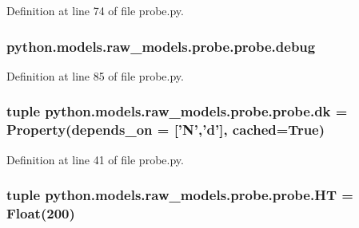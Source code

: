 Definition at line 74 of file probe.\-py.

\hypertarget{classpython_1_1models_1_1raw__models_1_1probe_1_1probe_a1efd16064847655675c89c36ec0da1d3}{
\subsubsection[{debug}]{\setlength{\rightskip}{0pt plus 5cm}python.\-models.\-raw\-\_\-models.\-probe.\-probe.\-debug}}\label{classpython_1_1models_1_1raw__models_1_1probe_1_1probe_a1efd16064847655675c89c36ec0da1d3}


Definition at line 85 of file probe.\-py.

\hypertarget{classpython_1_1models_1_1raw__models_1_1probe_1_1probe_a58c9fb8a7bbec972b51f5839d815f793}{
\subsubsection[{dk}]{\setlength{\rightskip}{0pt plus 5cm}tuple python.\-models.\-raw\-\_\-models.\-probe.\-probe.\-dk = Property(depends\-\_\-on = \mbox{[}'{\bf N}','{\bf d}'\mbox{]}, cached=True)\hspace{0.3cm}{\ttfamily [static]}}}\label{classpython_1_1models_1_1raw__models_1_1probe_1_1probe_a58c9fb8a7bbec972b51f5839d815f793}


Definition at line 41 of file probe.\-py.

\hypertarget{classpython_1_1models_1_1raw__models_1_1probe_1_1probe_a60c26931675d548d6d7886178df71655}{
\subsubsection[{H\-T}]{\setlength{\rightskip}{0pt plus 5cm}tuple python.\-models.\-raw\-\_\-models.\-probe.\-probe.\-H\-T = Float(200)\hspace{0.3cm}{\ttfamily [static]}}}\label{classpython_1_1models_1_1raw__models_1_1probe_1_1probe_a60c26931675d548d6d7886178df71655}


